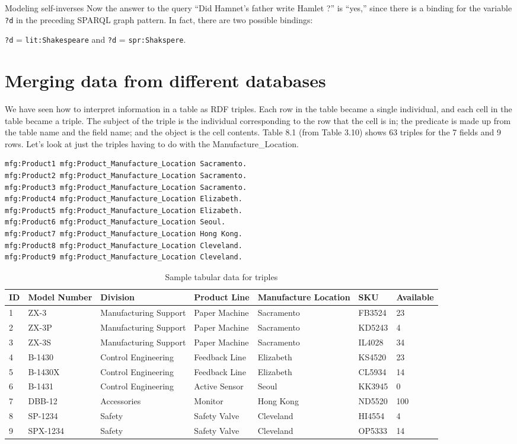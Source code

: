 \begin{challenge}{Modeling self-inverses}
Now the answer to the query ``Did Hamnet's father write Hamlet ?'' is
``yes,'' since there is a binding for the variable \texttt{?d} in the preceding
SPARQL graph pattern. In fact, there are two possible bindings:

\texttt{?d} = \texttt{lit:Shakespeare} and \texttt{?d} = \texttt{spr:Shakspere}.
\end{challenge}


\section{Merging data from different databases}

We have seen how to interpret information in a table as RDF triples.
Each row in the table became a single individual, and each cell in the
table became a triple. The subject of the triple is the individual
corresponding to the row that the cell is in; the predicate is made up
from the table name and the field name; and the object is the cell
contents. Table 8.1 (from Table 3.10) shows
63 triples for the 7 fields and 9 rows. Let's look at just the triples
having to do with the
Manufacture\_Location.

\begin{lstlisting}
mfg:Product1 mfg:Product_Manufacture_Location Sacramento.
mfg:Product2 mfg:Product_Manufacture_Location Sacramento.
mfg:Product3 mfg:Product_Manufacture_Location Sacramento.
mfg:Product4 mfg:Product_Manufacture_Location Elizabeth.
mfg:Product5 mfg:Product_Manufacture_Location Elizabeth.
mfg:Product6 mfg:Product_Manufacture_Location Seoul.
mfg:Product7 mfg:Product_Manufacture_Location Hong Kong.
mfg:Product8 mfg:Product_Manufacture_Location Cleveland.
mfg:Product9 mfg:Product_Manufacture_Location Cleveland.
\end{lstlisting}


\begin{table}
\label{tab:ch9.1}
\caption{Sample tabular data for triples}
\begin{tabular}{|l l l l l l l|}
\hline
ID&Model Number&Division&Product Line&Manufacture Location&SKU&Available\\
\hline
1&ZX-3&Manufacturing Support&Paper Machine&Sacramento&FB3524&23\\
2&ZX-3P&Manufacturing Support&Paper Machine&Sacramento&KD5243&4\\
3&ZX-3S&Manufacturing Support&Paper Machine&Sacramento&IL4028&34\\
4&B-1430&Control Engineering&Feedback Line&Elizabeth&KS4520&23\\
5&B-1430X&Control Engineering&Feedback Line&Elizabeth&CL5934&14\\
6&B-1431&Control Engineering&Active Sensor&Seoul&KK3945&0\\
7&DBB-12&Accessories&Monitor&Hong Kong&ND5520&100\\
8&SP-1234&Safety&Safety Valve&Cleveland&HI4554&4\\
9&SPX-1234&Safety&Safety Valve&Cleveland&OP5333&14\\
\hline
\end{tabular}
\end{table}

